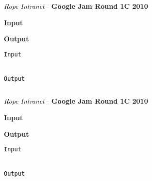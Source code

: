 \begin{solution}
	
	\begin{lstlisting}[language=c++, caption="Store credit c++ solution"]


	\end{lstlisting}
\end{solution}




\begin{problem}{\textit{Rope Intranet} - \textbf{Google Jam Round 1C 2010}}




\textbf{Input}


\textbf{Output}


\begin{framed}
	\begin{verbatim}
Input 


Output 

	\end{verbatim}
\end{framed}

\end{problem}

\begin{solution}
	
	\begin{lstlisting}[language=c++, caption="Store credit c++ solution"]


	\end{lstlisting}
\end{solution}




\begin{problem}{\textit{Rope Intranet} - \textbf{Google Jam Round 1C 2010}}




\textbf{Input}


\textbf{Output}


\begin{framed}
	\begin{verbatim}
Input 


Output 

	\end{verbatim}
\end{framed}

\end{problem}

\begin{solution}
	
	\begin{lstlisting}[language=c++, caption="Store credit c++ solution"]


	\end{lstlisting}
\end{solution}



